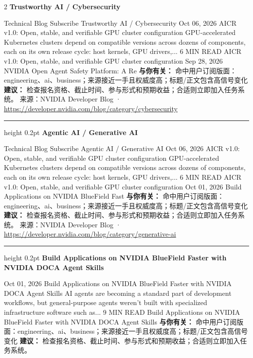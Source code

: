 \documentclass[10.5pt]{ctexart}
\begin{document}
\begin{multicols}{2}
{\large\bfseries Trustworthy AI / Cybersecurity}\par
Technical Blog Subscribe Trustworthy AI / Cybersecurity Oct 06, 2026 AICR v1.0: Open, stable, and verifiable GPU cluster configuration GPU-accelerated Kubernetes clusters depend on compatible versions across dozens of components, each on its own release cycle: host kernels, GPU drivers,... 6 MIN READ AICR v1.0: Open, stable, and verifiable GPU cluster configuration Sep 28, 2026 NVIDIA Open Agent Safety Platform: A Re
\textbf{与你有关：} 命中用户订阅版面：engineering、ai、business；来源接近一手且权威度高；标题/正文包含高信号变化
\textbf{建议：} 检查报名资格、截止时间、参与形式和预期收益；合适则立即加入任务系统。
{\footnotesize\color{ormuted} 来源：NVIDIA Developer Blog · \url{https://developer.nvidia.com/blog/category/cybersecurity}}
\vspace{2mm}
\hrule height 0.2pt
\vspace{2mm}
{\large\bfseries Agentic AI / Generative AI}\par
Technical Blog Subscribe Agentic AI / Generative AI Oct 06, 2026 AICR v1.0: Open, stable, and verifiable GPU cluster configuration GPU-accelerated Kubernetes clusters depend on compatible versions across dozens of components, each on its own release cycle: host kernels, GPU drivers,... 6 MIN READ AICR v1.0: Open, stable, and verifiable GPU cluster configuration Oct 01, 2026 Build Applications on NVIDIA BlueField Fast
\textbf{与你有关：} 命中用户订阅版面：engineering、ai、business；来源接近一手且权威度高；标题/正文包含高信号变化
\textbf{建议：} 检查报名资格、截止时间、参与形式和预期收益；合适则立即加入任务系统。
{\footnotesize\color{ormuted} 来源：NVIDIA Developer Blog · \url{https://developer.nvidia.com/blog/category/generative-ai}}
\vspace{2mm}
\hrule height 0.2pt
\vspace{2mm}
{\large\bfseries Build Applications on NVIDIA BlueField Faster with NVIDIA DOCA Agent Skills}\par
Oct 01, 2026 Build Applications on NVIDIA BlueField Faster with NVIDIA DOCA Agent Skills AI agents are becoming a standard part of development workflows, but general-purpose agents weren't built with specialized infrastructure software such as... 9 MIN READ Build Applications on NVIDIA BlueField Faster with NVIDIA DOCA Agent Skills
\textbf{与你有关：} 命中用户订阅版面：engineering、ai、business；来源接近一手且权威度高；标题/正文包含高信号变化
\textbf{建议：} 检查报名资格、截止时间、参与形式和预期收益；合适则立即加入任务系统。

\end{multicols}
\end{document}

